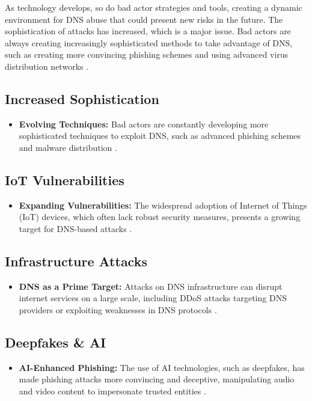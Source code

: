As technology develops, so do bad actor strategies and tools, creating a dynamic environment for DNS abuse that could present new risks in the future. The sophistication of attacks has increased, which is a major issue. Bad actors are always creating increasingly sophisticated methods to take advantage of DNS, such as creating more convincing phishing schemes and using advanced virus distribution networks \cite{icann2022dnsabusetrends}.

\subsection{Increased Sophistication}
\begin{itemize}
    \item \textbf{Evolving Techniques:} Bad actors are constantly developing more sophisticated techniques to exploit DNS, such as advanced phishing schemes and malware distribution \cite{wrightson2014advanced}.
\end{itemize}

\subsection{IoT Vulnerabilities}
\begin{itemize}
    \item \textbf{Expanding Vulnerabilities:} The widespread adoption of Internet of Things (IoT) devices, which often lack robust security measures, presents a growing target for DNS-based attacks \cite{mahmoud2015internet}.
\end{itemize}

\subsection{Infrastructure Attacks}
\begin{itemize}
    \item \textbf{DNS as a Prime Target:} Attacks on DNS infrastructure can disrupt internet services on a large scale, including DDoS attacks targeting DNS providers or exploiting weaknesses in DNS protocols \cite{dooley2017dns}.
\end{itemize}

\subsection{Deepfakes \& AI}
\begin{itemize}
    \item \textbf{AI-Enhanced Phishing:} The use of AI technologies, such as deepfakes, has made phishing attacks more convincing and deceptive, manipulating audio and video content to impersonate trusted entities \cite{schick2020deep}.
\end{itemize}

